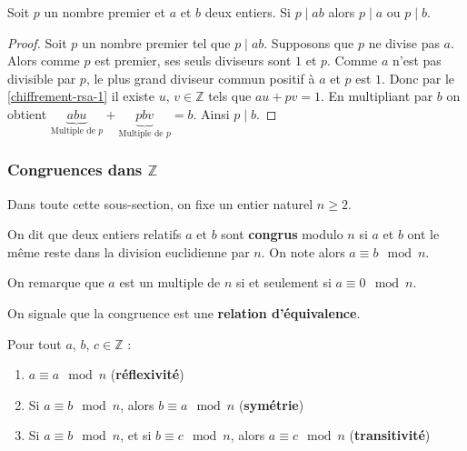   \begin{lemma}[Euclide]
    \label{chiffrement-rsa-4}
    Soit $p$ un nombre premier et $a$ et $b$ deux entiers. Si $p \mid ab$ alors $p \mid a$ ou $p \mid b$.
  \end{lemma}

  \begin{proof}
    Soit $p$ un nombre premier tel que $p \mid ab$. Supposons que $p$ ne divise pas $a$. Alors comme $p$ est premier, ses seuls diviseurs sont $1$ et $p$. Comme $a$ n'est pas divisible par $p$, le plus grand diviseur commun positif à $a$ et $p$ est $1$. Donc par le \cref{chiffrement-rsa-1} il existe $u$, $v \in \mathbb{Z}$ tels que $au + pv = 1$. En multipliant par $b$ on obtient $\underbrace{abu}_{\text{Multiple de } p} + \underbrace{pbv}_{\text{Multiple de } p} = b$. Ainsi $p \mid b$.
  \end{proof}

  \subsubsection{Congruences dans $\mathbb{Z}$}

  Dans toute cette sous-section, on fixe un entier naturel $n \geq 2$.

  \begin{definition}
    On dit que deux entiers relatifs $a$ et $b$ sont \textbf{congrus} modulo $n$ si $a$ et $b$ ont le même reste dans la division euclidienne par $n$. On note alors $a \equiv b \mod n$.
  \end{definition}

  \begin{remark}
    \label{chiffrement-rsa-3}
    On remarque que $a$ est un multiple de $n$ si et seulement si $a \equiv 0 \mod n$.
  \end{remark}

  On signale que la congruence est une \textbf{relation d'équivalence}.

  \begin{proposition}
    Pour tout $a$, $b$, $c \in \mathbb{Z}$ :
    \begin{enumerate}[label=(\roman*)]
      \item $a \equiv a \mod n$ (\textbf{réflexivité})
      \item Si $a \equiv b \mod n$, alors $b \equiv a \mod n$ (\textbf{symétrie})
      \item Si $a \equiv b \mod n$, et si $b \equiv c \mod n$, alors $a \equiv c \mod n$ (\textbf{transitivité})
    \end{enumerate}
  \end{proposition}

